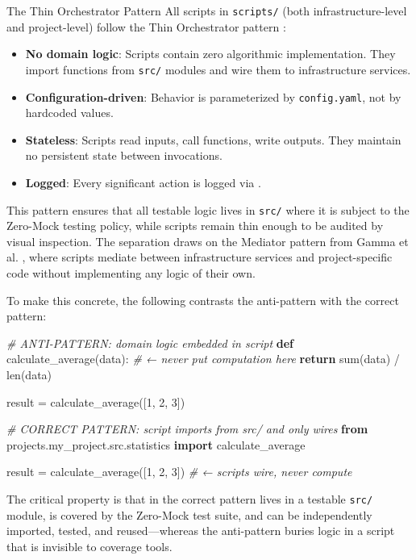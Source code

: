 \documentclass[
  ignorenonframetext,
]{beamer}
\newenvironment{Shaded}{}{}
\newcommand{\BuiltInTok}[1]{\textcolor[rgb]{0.00,0.50,0.00}{#1}}
\newcommand{\CommentTok}[1]{\textcolor[rgb]{0.38,0.63,0.69}{\textit{#1}}}
\newcommand{\ControlFlowTok}[1]{\textcolor[rgb]{0.00,0.44,0.13}{\textbf{#1}}}
\newcommand{\DecValTok}[1]{\textcolor[rgb]{0.25,0.63,0.44}{#1}}
\newcommand{\ImportTok}[1]{\textcolor[rgb]{0.00,0.50,0.00}{\textbf{#1}}}
\newcommand{\KeywordTok}[1]{\textcolor[rgb]{0.00,0.44,0.13}{\textbf{#1}}}
\newcommand{\NormalTok}[1]{#1}
\newcommand{\OperatorTok}[1]{\textcolor[rgb]{0.40,0.40,0.40}{#1}}
\providecommand{\tightlist}{%
  \setlength{\itemsep}{0pt}\setlength{\parskip}{0pt}}
\begin{document}
\begin{frame}{The Thin Orchestrator Pattern}
\protect{}\label{the-thin-orchestrator-pattern}
All scripts in \texttt{scripts/} (both infrastructure-level and
project-level) follow the Thin Orchestrator pattern
:

\begin{itemize}
\tightlist
\item
  \textbf{No domain logic}: Scripts contain zero algorithmic
  implementation. They import functions from \texttt{src/} modules and
  wire them to infrastructure services.
\item
  \textbf{Configuration-driven}: Behavior is parameterized by
  \texttt{config.yaml}, not by hardcoded values.
\item
  \textbf{Stateless}: Scripts read inputs, call functions, write
  outputs. They maintain no persistent state between invocations.
\item
  \textbf{Logged}: Every significant action is logged via
  .
\end{itemize}

This pattern ensures that all testable logic lives in \texttt{src/}
where it is subject to the Zero-Mock testing policy, while scripts
remain thin enough to be audited by visual inspection. The separation
draws on the Mediator pattern from Gamma et al. ,
where scripts mediate between infrastructure services and
project-specific code without implementing any logic of their own.

To make this concrete, the following contrasts the anti-pattern with the
correct pattern:

\begin{Shaded}
\begin{Highlighting}[]
\CommentTok{\# ANTI{-}PATTERN: domain logic embedded in script}
\KeywordTok{def}\NormalTok{ calculate\_average(data):          }\CommentTok{\# ← never put computation here}
    \ControlFlowTok{return} \BuiltInTok{sum}\NormalTok{(data) }\OperatorTok{/} \BuiltInTok{len}\NormalTok{(data)}

\NormalTok{result }\OperatorTok{=}\NormalTok{ calculate\_average([}\DecValTok{1}\NormalTok{, }\DecValTok{2}\NormalTok{, }\DecValTok{3}\NormalTok{])}

\CommentTok{\# CORRECT PATTERN: script imports from src/ and only wires}
\ImportTok{from}\NormalTok{ projects.my\_project.src.statistics }\ImportTok{import}\NormalTok{ calculate\_average}

\NormalTok{result }\OperatorTok{=}\NormalTok{ calculate\_average([}\DecValTok{1}\NormalTok{, }\DecValTok{2}\NormalTok{, }\DecValTok{3}\NormalTok{])  }\CommentTok{\# ← scripts wire, never compute}
\end{Highlighting}
\end{Shaded}

The critical property is that  in the correct
pattern lives in a testable \texttt{src/} module, is covered by the
Zero-Mock test suite, and can be independently imported, tested, and
reused---whereas the anti-pattern buries logic in a script that is
invisible to coverage tools.
\end{frame}
\end{document}
